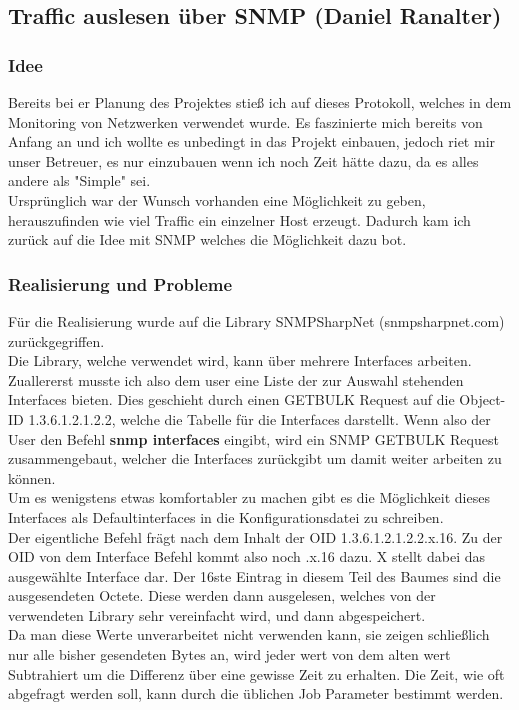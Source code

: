 \documentclass[12pt,a4paper]{report}
\begin{document}
\begin{onehalfspace}
\subsection{Traffic auslesen über SNMP (Daniel Ranalter)}
\subsubsection{Idee}
Bereits bei er Planung des Projektes stieß ich auf dieses Protokoll, welches in dem Monitoring von Netzwerken verwendet wurde. Es faszinierte mich bereits von Anfang an und ich wollte es unbedingt in das Projekt einbauen, jedoch riet mir unser Betreuer, es nur einzubauen wenn ich noch Zeit hätte dazu, da es alles andere als "Simple" sei.\\
Ursprünglich war der Wunsch vorhanden eine Möglichkeit zu geben, herauszufinden wie viel Traffic ein einzelner Host erzeugt. Dadurch kam ich zurück auf die Idee mit SNMP welches die Möglichkeit dazu bot.\\

\subsubsection{Realisierung und Probleme}
Für die Realisierung wurde auf die Library SNMPSharpNet (snmpsharpnet.com) zurückgegriffen.\\

Die Library, welche verwendet wird, kann über mehrere Interfaces arbeiten. Zuallererst musste ich also dem user eine Liste der zur Auswahl stehenden Interfaces bieten. Dies geschieht durch einen GETBULK Request auf die Object-ID 1.3.6.1.2.1.2.2, welche die Tabelle für die Interfaces darstellt. Wenn also der User den Befehl \textbf{snmp interfaces} eingibt, wird ein SNMP GETBULK Request zusammengebaut, welcher die Interfaces zurückgibt um damit weiter arbeiten zu können.\\
Um es wenigstens etwas komfortabler zu machen gibt es die Möglichkeit dieses Interfaces als Defaultinterfaces in die Konfigurationsdatei zu schreiben.\\

Der eigentliche Befehl frägt nach dem Inhalt der OID 1.3.6.1.2.1.2.2.x.16. Zu der OID von dem Interface Befehl kommt also noch .x.16 dazu. X stellt dabei das ausgewählte Interface dar. Der 16ste Eintrag in diesem Teil des Baumes sind die ausgesendeten Octete. Diese werden dann ausgelesen, welches von der verwendeten Library sehr vereinfacht wird, und dann abgespeichert.\\
Da man diese Werte unverarbeitet nicht verwenden kann, sie zeigen schließlich nur alle bisher gesendeten Bytes an, wird jeder wert von dem alten wert Subtrahiert um die Differenz über eine gewisse Zeit zu erhalten. Die Zeit, wie oft abgefragt werden soll, kann durch die üblichen Job Parameter bestimmt werden.\\


\end{onehalfspace}
\end{document}
